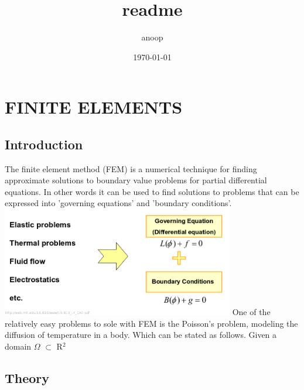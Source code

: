 \documentclass[11pt]{article}
\author{anoop}
\date{\today}
\title{readme}
\begin{document}
\maketitle
\tableofcontents

\section{FINITE ELEMENTS}
\label{sec-1}
\subsection{Introduction}
\label{sec-1-1}
The finite element method (FEM) is a numerical technique for finding approximate solutions to boundary value problems for partial differential equations. In other words it can be used to find solutions to problems that can be expressed into 'governing equations' and 'boundary conditions'.
\includegraphics[width=4in]{images/fem.png}
One of the relatively easy problems to sole with FEM is the Poisson's problem, modeling the diffusion of temperature in a body. Which can be stated as follows. Given a domain $\Omega$ $\subset$ R$^{\text{2}}$

\subsection{Theory}
\label{sec-1-2}
\end{document}
